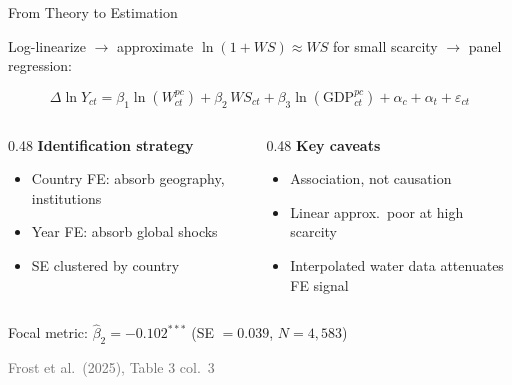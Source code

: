 \documentclass[aspectratio=169,12pt]{beamer}
\newcommand{\source}[1]{\vfill\hfill{\tiny\textcolor{dimgray}{#1}}}
\begin{document}
\begin{frame}{From Theory to Estimation}

Log-linearize $\to$ approximate $\ln(1+WS) \approx WS$ for small scarcity $\to$ panel regression:

\vspace{0.2cm}
\[
\boxed{\;\Delta\ln Y_{ct} = \beta_1 \ln(W^{pc}_{ct}) + \beta_2\, WS_{ct} + \beta_3 \ln(\text{GDP}^{pc}_{ct}) + \alpha_c + \alpha_t + \varepsilon_{ct}\;}
\]

\vspace{0.3cm}
\begin{columns}[T]
\begin{column}{0.48\textwidth}
\textbf{Identification strategy}
\begin{itemize}
    \item Country FE: absorb geography, institutions
    \item Year FE: absorb global shocks
    \item SE clustered by country
\end{itemize}
\end{column}
\begin{column}{0.48\textwidth}
\textbf{Key caveats}
\begin{itemize}
    \item Association, not causation
    \item Linear approx.\ poor at high scarcity
    \item Interpolated water data attenuates FE signal
\end{itemize}
\end{column}
\end{columns}

\vspace{0.3cm}
\centering
\alert{Focal metric}: $\hat{\beta}_2 = -0.102^{***}$ \quad (SE $= 0.039$, $N = 4{,}583$)

\source{Frost et al.\ (2025), Table 3 col.\ 3}
\end{frame}
\end{document}
